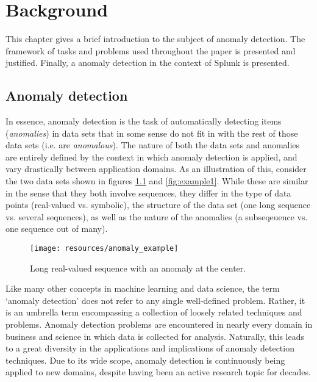 \chapter{Background}
\label{ch:background}

This chapter gives a brief introduction to the subject of anomaly detection. The framework of tasks and problems used throughout the paper is presented and justified. Finally, a anomaly detection in the context of Splunk is presented.

\section{Anomaly detection}
\label{sect:adb}

In essence, anomaly detection is the task of automatically detecting items (\emph{anomalies}) in data sets that in some sense do not fit in with the rest of those data sets (i.e. are \emph{anomalous}). The nature of both the data sets and anomalies are entirely defined by the context in which anomaly detection is applied, and vary drastically between application domains. As an illustration of this, consider the two data sets shown in figures \ref{fig:example2} and \ref{fig:example1}. While these are similar in the sense that they both involve sequences, they differ in the type of data points (real-valued vs. symbolic), the structure of the data set (one long sequence vs. several sequences), as well as the nature of the anomalies (a subseqeuence vs. one sequence out of many).

\begin{figure}[htb]
    \centering
    \texttt{[image: resources/anomaly\_example]}
    \caption{\small Long real-valued sequence with an anomaly at the center.}
    \vspace{-0pt}
    \label{fig:example2}
\end{figure}

Like many other concepts in machine learning and data science, the term `anomaly detection' does not refer to any single well-defined problem. Rather, it is an umbrella term encompassing a collection of loosely related techniques and problems. Anomaly detection problems are encountered in nearly every domain in business and science in which data is collected for analysis. Naturally, this leads to a great diversity in the applications and implications of anomaly detection techniques. Due to its wide scope, anomaly detection is continuously being applied to new domains, despite having been an active research topic for decades.

